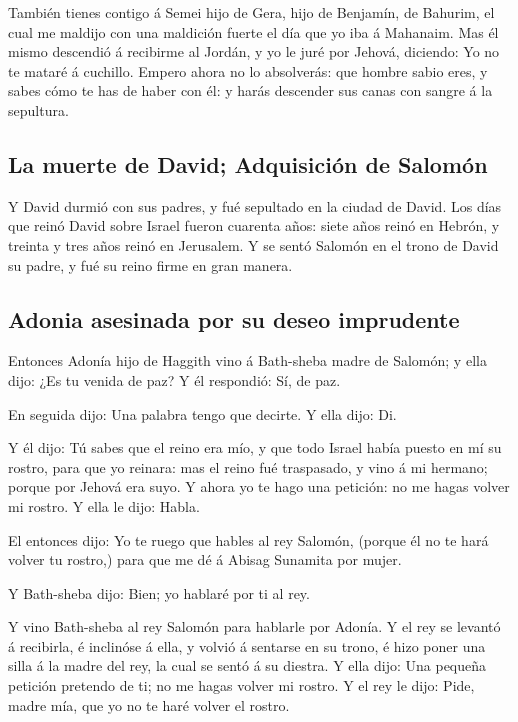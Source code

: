  También tienes contigo á Semei hijo de Gera, hijo de
Benjamín, de Bahurim, el cual me maldijo con una maldición fuerte el día
que yo iba á Mahanaim. Mas él mismo descendió á recibirme al Jordán, y
yo le juré por Jehová, diciendo: Yo no te mataré á cuchillo.
 Empero ahora no lo absolverás: que hombre sabio eres, y
sabes cómo te has de haber con él: y harás descender sus canas con
sangre á la sepultura.

\hypertarget{la-muerte-de-david-adquisiciuxf3n-de-salomuxf3n}{%
\subsection{La muerte de David; Adquisición de
Salomón}\label{la-muerte-de-david-adquisiciuxf3n-de-salomuxf3n}}

 Y David durmió con sus padres, y fué sepultado en la
ciudad de David.  Los días que reinó David sobre Israel
fueron cuarenta años: siete años reinó en Hebrón, y treinta y tres años
reinó en Jerusalem.  Y se sentó Salomón en el trono de
David su padre, y fué su reino firme en gran manera.

\hypertarget{adonia-asesinada-por-su-deseo-imprudente}{%
\subsection{Adonia asesinada por su deseo
imprudente}\label{adonia-asesinada-por-su-deseo-imprudente}}

 Entonces Adonía hijo de Haggith vino á Bath-sheba madre de
Salomón; y ella dijo: ¿Es tu venida de paz? Y él respondió: Sí, de paz.

 En seguida dijo: Una palabra tengo que decirte. Y ella
dijo: Di.

 Y él dijo: Tú sabes que el reino era mío, y que todo
Israel había puesto en mí su rostro, para que yo reinara: mas el reino
fué traspasado, y vino á mi hermano; porque por Jehová era suyo.
 Y ahora yo te hago una petición: no me hagas volver mi
rostro. Y ella le dijo: Habla.

 El entonces dijo: Yo te ruego que hables al rey Salomón,
(porque él no te hará volver tu rostro,) para que me dé á Abisag
Sunamita por mujer.

 Y Bath-sheba dijo: Bien; yo hablaré por ti al rey.

 Y vino Bath-sheba al rey Salomón para hablarle por Adonía.
Y el rey se levantó á recibirla, é inclinóse á ella, y volvió á sentarse
en su trono, é hizo poner una silla á la madre del rey, la cual se sentó
á su diestra.  Y ella dijo: Una pequeña petición pretendo
de ti; no me hagas volver mi rostro. Y el rey le dijo: Pide, madre mía,
que yo no te haré volver el rostro.

